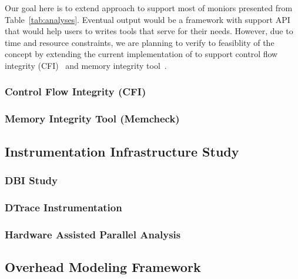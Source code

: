 Our goal here is to extend \sreplica approach to support most of moniors
presented from Table~\ref{tab:analyses}. Eventual output would be a framework
with support API that would help users to writes tools that serve for their
needs. However, due to time and resource constraints, we are planning to verify
to feasiblity of the concept by extending the current implementation of
\sreplica to support control flow integrity (CFI)~\cite{} and memory integrity
tool~\cite{}.

\subsubsection{Control Flow Integrity (CFI)} 

\subsubsection{Memory Integrity Tool (Memcheck)}

\subsection{Instrumentation Infrastructure Study}
\subsubsection{DBI Study}
\subsubsection{DTrace Instrumentation}
\subsubsection{Hardware Assisted Parallel Analysis}
\subsection{Overhead Modeling Framework}
